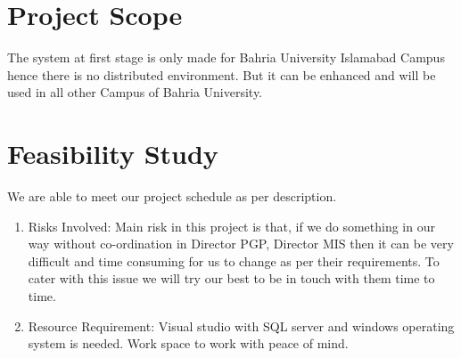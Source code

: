 	\section{Project Scope}
	The system at first stage is only made for Bahria University Islamabad Campus hence there is no distributed environment. But it can be enhanced and will be used in all other Campus of Bahria University. 

 \section{Feasibility Study}
We are able to meet our project schedule as per description.
\begin{enumerate}
\item Risks Involved: Main risk in this project is that, if we do something in our way without co-ordination in Director PGP, Director MIS then it can be very difficult and time consuming for us to change as per their requirements. To cater with this issue we will try our best to be in touch with them time to time.
\item Resource Requirement: Visual studio with SQL server and windows operating system is needed. Work space to work with peace of mind.
\end{enumerate}




